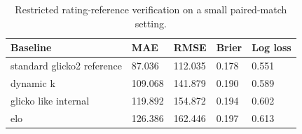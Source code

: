 \begin{table}[t]
\centering
\small
\caption{Restricted rating-reference verification on a small paired-match setting.}
\label{tab:standard-reference}
\begin{tabularx}{\textwidth}{p{}p{}p{}p{}p{}}
\toprule
Baseline & MAE & RMSE & Brier & Log loss \\
\midrule
standard glicko2 reference & 87.036 & 112.035 & 0.178 & 0.551 \\
dynamic k & 109.068 & 141.879 & 0.190 & 0.589 \\
glicko like internal & 119.892 & 154.872 & 0.194 & 0.602 \\
elo & 126.386 & 162.446 & 0.197 & 0.613 \\
\bottomrule
\end{tabularx}
\end{table}
